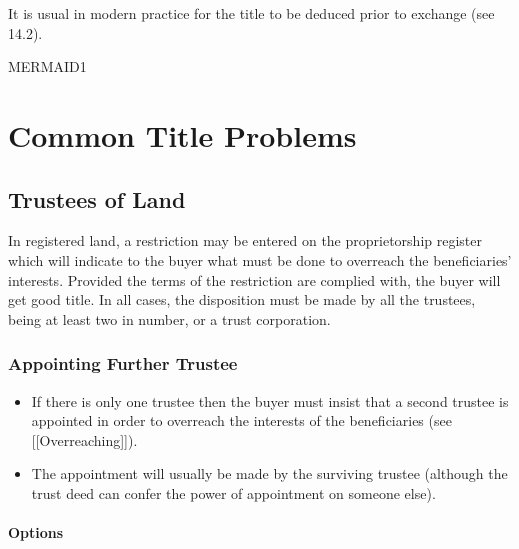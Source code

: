 \documentclass[
]{article}
\providecommand{\tightlist}{%
  \setlength{\itemsep}{0pt}\setlength{\parskip}{0pt}}
\begin{document}
It is usual in modern practice for the title to be deduced prior to
exchange (see 14.2).

MERMAID1

\hypertarget{common-title-problems-1}{%
\section{Common Title Problems}\label{common-title-problems-1}}

\hypertarget{trustees-of-land}{%
\subsection{Trustees of Land}\label{trustees-of-land}}

In registered land, a restriction may be entered on the proprietorship
register which will indicate to the buyer what must be done to overreach
the beneficiaries' interests. Provided the terms of the restriction are
complied with, the buyer will get good title. In all cases, the
disposition must be made by all the trustees, being at least two in
number, or a trust corporation.

\hypertarget{appointing-further-trustee}{%
\subsubsection{Appointing Further
Trustee}\label{appointing-further-trustee}}

\begin{itemize}
\tightlist
\item
  If there is only one trustee then the buyer must insist that a second
  trustee is appointed in order to overreach the interests of the
  beneficiaries (see {[}{[}Overreaching{]}{]}).
\item
  The appointment will usually be made by the surviving trustee
  (although the trust deed can confer the power of appointment on
  someone else).
\end{itemize}

\hypertarget{options}{%
\paragraph{Options}\label{options}}
\end{document}
